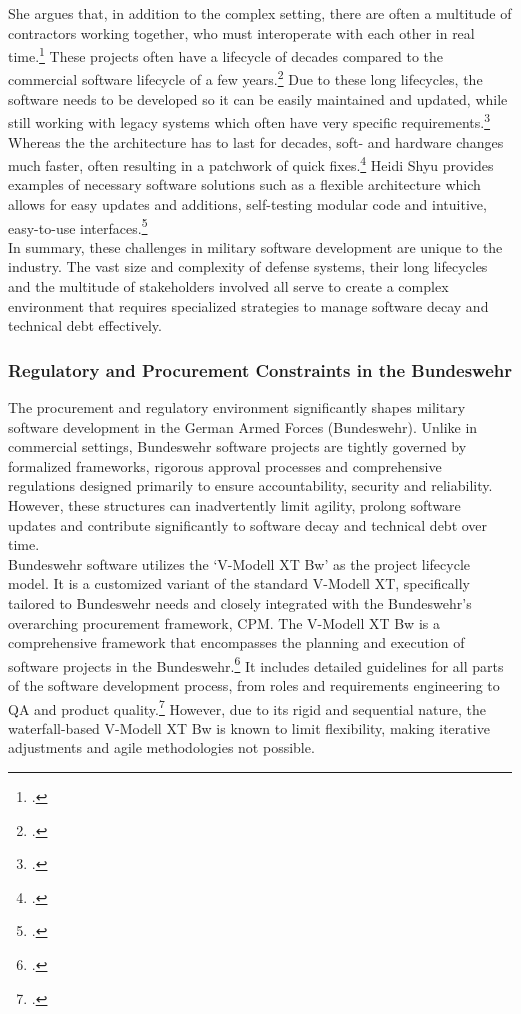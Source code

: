 She argues that, in addition to the complex setting, there are often a multitude of contractors working together, who must interoperate with each other in real time.\footcite[11]{shyu2017military}
These projects often have a lifecycle of decades compared to the commercial software lifecycle of a few years.\footcite[14]{shyu2017military}
Due to these long lifecycles, the software needs to be developed so it can be easily maintained and updated, while still working with legacy systems
which often have very specific requirements.\footcite[14]{shyu2017military}
Whereas the the architecture has to last for decades, soft- and hardware changes much faster, often resulting in a patchwork of quick fixes.\footcite[15]{shyu2017military}
Heidi Shyu provides examples of necessary software solutions such as a flexible architecture which allows for easy updates and additions, self-testing modular code and intuitive, easy-to-use interfaces.\footcite[17]{shyu2017military}\\

In summary, these challenges in military software development are unique to the industry. The vast size and complexity of defense systems,
their long lifecycles and the multitude of stakeholders involved all serve to create a complex environment that requires specialized strategies to manage software decay and technical debt effectively.

\subsubsection{Regulatory and Procurement Constraints in the Bundeswehr}
The procurement and regulatory environment significantly shapes military software development in the German Armed Forces (Bundeswehr). Unlike in commercial settings,
Bundeswehr software projects are tightly governed by formalized frameworks, rigorous approval processes and comprehensive regulations designed primarily to ensure 
accountability, security and reliability. However, these structures can inadvertently limit agility, prolong software updates and contribute significantly to software decay
and technical debt over time.\\

Bundeswehr software utilizes the `V-Modell XT Bw' as the project lifecycle model. It is a customized variant of the standard V-Modell XT, specifically tailored to Bundeswehr needs and closely integrated with the 
Bundeswehr's overarching procurement framework, \ac{CPM}.
The V-Modell XT Bw is a comprehensive framework that encompasses the planning and execution of software projects in the Bundeswehr.\footcite[6]{bundeswehrVModellXTBw}
It includes detailed guidelines for all parts of the software development process, from roles and requirements engineering to \ac{QA} and product quality.\footcite[pp. 20-21]{bundeswehrVModellXTBw}
However, due to its rigid and sequential nature, the waterfall-based V-Modell XT Bw is known to limit flexibility, making iterative adjustments and agile methodologies not possible.\\

